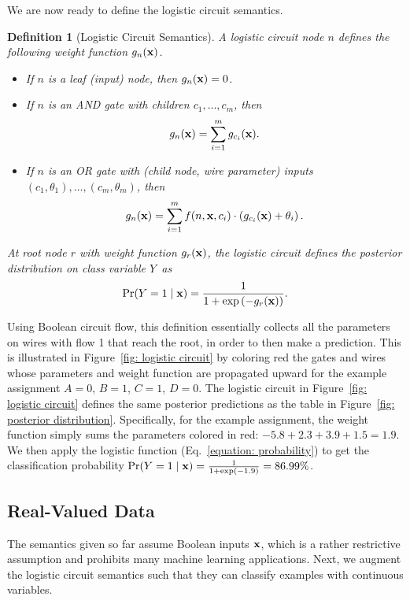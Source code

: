 \documentclass[letterpaper]{article} %
\newtheorem{definition}{Definition}
\newcommand{\node}{n}
\newcommand{\coe}{g}
\newcommand{\sample}{{\bf x}}
\begin{document}
We are now ready to define the logistic circuit semantics.
\begin{definition}[Logistic Circuit Semantics]
\label{de: circuit semantics}
A logistic circuit node $n$ defines the following weight function $\coe_{\node}({\bf x})$.
\begin{itemize}
\item[--] If $\node$ is a leaf (input) node, then $\coe_{\node}({\bf x}) = 0$.

\item[--] If $\node$ is an AND gate with children $c_1,\dots,c_m$, then
\begin{align*}
{\coe}_{\node}({\bf x}) =  \sum_{i=1}^m \coe_{c_i}({\bf x}).
\end{align*}

\item[--] If $\node$ is an OR gate with (child node, wire parameter) inputs $(c_1,\theta_1),\dots, (c_m, \theta_m)$, then
\begin{align*}
{\coe}_{\node}({\bf x}) =    \sum_{i=1}^m  f(n, {\bf x}, c_i) \cdot \left({\coe}_{c_i}({\bf x}) + \theta_i\right).
\end{align*}
\end{itemize}
At root node $r$ with weight function $\coe_r({\bf x})$, the logistic circuit defines the posterior distribution on class variable $Y$~as
\begin{align}
\label{equation: probability}
{\Pr} ( Y = 1 \mid {\bf x}) = \frac{1}{1 + \exp\left(-\coe_{r}({\bf x})  \right)}.
\end{align}
\end{definition}
Using Boolean circuit flow, this definition essentially collects all the parameters on wires with flow 1 that reach the root, in order to then make a prediction.
This is illustrated in Figure~\ref{fig: logistic circuit} by coloring red the gates and wires whose parameters and weight function are propagated upward for the example assignment $A=0$, $B=1$, $C=1$, $D=0$.
The logistic circuit in Figure~\ref{fig: logistic circuit} defines the same posterior predictions as the table in Figure~\ref{fig: posterior distribution}. Specifically, for the example assignment, the weight function simply sums the parameters colored in red: $-5.8+2.3+3.9+1.5 = 1.9$. We then apply the logistic function (Eq.~\ref{equation: probability}) to get the classification probability $\Pr(Y=1 \mid \sample) = \frac{1}{1+\exp(-1.9)} = 86.99\%$.


\subsection{Real-Valued Data}
\label{s: real-valued data}
The semantics given so far assume Boolean inputs $\sample$, which is a rather restrictive assumption and prohibits many machine learning applications.
Next, we augment the logistic circuit semantics such that they can classify examples with continuous variables.
\end{document}
